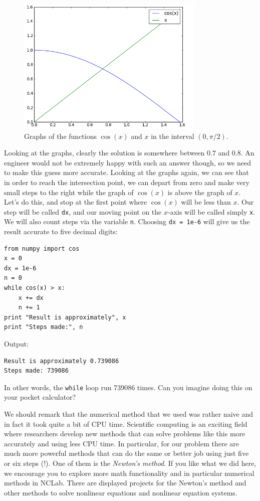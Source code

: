 \begin{figure}[!ht]
\begin{center}
\includegraphics[width=0.8\textwidth]{imgp/xcosx.png}
\end{center}
\vspace{-2mm}
\caption{Graphs of the functions $\cos(x)$ and $x$ in the interval $(0, \pi/2)$.}
\label{fig:xcosx}
\end{figure}
\noindent
Looking at the graphs, clearly the solution is somewhere 
between $0.7$ and $0.8$. 
An engineer would not be extremely happy with such an answer though, 
so we need to make this guess more accurate. Looking at the graphs again, we can see
that in order to reach the intersection point, we can depart from zero and make very 
small steps to the right while the graph of $\cos(x)$ is above the graph of $x$.
Let's do this, and stop 
at the first point where $\cos(x)$ will be less than $x$. Our step will be called {\tt dx},
and our moving point on the $x$-axis will be called simply {\tt x}. We will also count 
steps via the variable {\tt n}. Choosing {\tt dx = 1e-6} will give us the result accurate 
to five decimal digits:

\begin{verbatim}
from numpy import cos
x = 0
dx = 1e-6
n = 0
while cos(x) > x:
    x += dx
    n += 1
print "Result is approximately", x
print "Steps made:", n
\end{verbatim}
Output:

\begin{verbatim}
Result is approximately 0.739086
Steps made: 739086
\end{verbatim}
In other words, the {\tt while} loop run 739086 times. Can you 
imagine doing this on your pocket calculator?

We should remark that the numerical method that we used was rather 
naive and in fact it took quite a bit of CPU time. Scientific computing
is an exciting field where researchers develop new methods that 
can solve problems like this more accurately and using less CPU time. 
In particular, for our problem there are much more powerful methods that can do the
same or better job using just five or six steps (!). One of them 
is the {\em Newton's method}. If you like what we did here, we encourage 
you to explore more math functionality and in particular numerical 
methods in NCLab. There are displayed projects for the Newton's method
and other methods to solve nonlinear equations and nonlinear equation systems.

